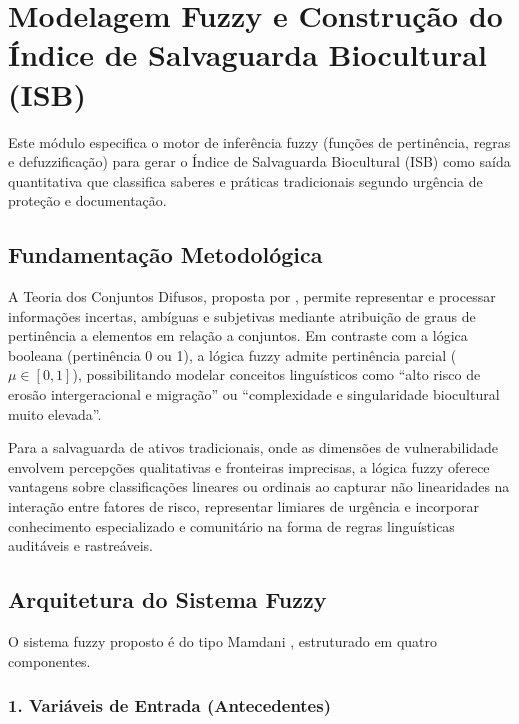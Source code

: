\section{Modelagem Fuzzy e Construção do Índice de Salvaguarda Biocultural (ISB)}

Este módulo especifica o motor de inferência fuzzy (funções de pertinência, regras e defuzzificação) para gerar o Índice de Salvaguarda Biocultural (ISB) como saída quantitativa que classifica saberes e práticas tradicionais segundo urgência de proteção e documentação.

\subsection{Fundamentação Metodológica}

A Teoria dos Conjuntos Difusos, proposta por , permite representar e processar informações incertas, ambíguas e subjetivas mediante atribuição de graus de pertinência a elementos em relação a conjuntos. Em contraste com a lógica booleana (pertinência 0 ou 1), a lógica fuzzy admite pertinência parcial ($\mu \in [0,1]$), possibilitando modelar conceitos linguísticos como ``alto risco de erosão intergeracional e migração'' ou ``complexidade e singularidade biocultural muito elevada''.

Para a salvaguarda de ativos tradicionais, onde as dimensões de vulnerabilidade envolvem percepções qualitativas e fronteiras imprecisas, a lógica fuzzy oferece vantagens sobre classificações lineares ou ordinais ao capturar não linearidades na interação entre fatores de risco, representar limiares de urgência e incorporar conhecimento especializado e comunitário na forma de regras linguísticas auditáveis e rastreáveis.

\subsection{Arquitetura do Sistema Fuzzy}

O sistema fuzzy proposto é do tipo Mamdani \cite{Mamdani1975}, estruturado em quatro componentes.

\subsubsection{1. Variáveis de Entrada (Antecedentes)}

